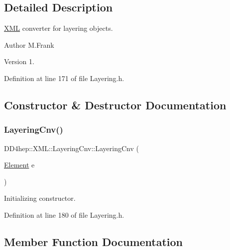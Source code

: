 \subsection{Detailed Description}
\hyperlink{namespace_d_d4hep_1_1_x_m_l}{X\+ML} converter for layering objects. 

\begin{DoxyAuthor}{Author}
M.\+Frank 
\end{DoxyAuthor}
\begin{DoxyVersion}{Version}
1. 
\end{DoxyVersion}


Definition at line 171 of file Layering.\+h.



\subsection{Constructor \& Destructor Documentation}
\hypertarget{class_d_d4hep_1_1_x_m_l_1_1_layering_cnv_ab6b99c78432dbaf778778eb47163eda7}{}\label{class_d_d4hep_1_1_x_m_l_1_1_layering_cnv_ab6b99c78432dbaf778778eb47163eda7} 
\subsubsection{\texorpdfstring{Layering\+Cnv()}{LayeringCnv()}}
{\footnotesize\ttfamily D\+D4hep\+::\+X\+M\+L\+::\+Layering\+Cnv\+::\+Layering\+Cnv (\begin{DoxyParamCaption}\item[{\hyperlink{class_d_d4hep_1_1_x_m_l_1_1_element}{Element}}]{e }\end{DoxyParamCaption})\hspace{0.3cm}{\ttfamily [inline]}}



Initializing constructor. 



Definition at line 180 of file Layering.\+h.



\subsection{Member Function Documentation}
\hypertarget{class_d_d4hep_1_1_x_m_l_1_1_layering_cnv_aee2e78c4203f97ec04b8583da85233ff}{}\label{class_d_d4hep_1_1_x_m_l_1_1_layering_cnv_aee2e78c4203f97ec04b8583da85233ff} 
